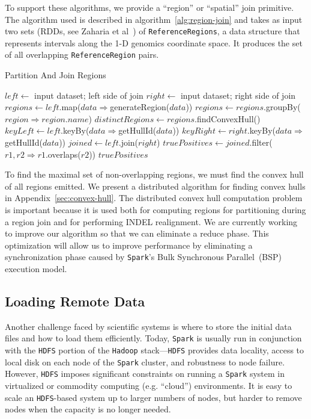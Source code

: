 \documentclass{acm_proc_article-sp}
\begin{document}
To support these algorithms, we provide a ``region'' or ``spatial'' join primitive. The algorithm used is described
in algorithm~\ref{alg:region-join} and takes as input two sets (RDDs, see Zaharia et al~\cite{zaharia12}) of
\texttt{ReferenceRegions}, a data structure that represents intervals along the 1-D genomics coordinate
space. It produces the set of all overlapping \texttt{ReferenceRegion} pairs.

\begin{algorithm}
\caption{Partition And Join Regions}
\label{alg:region-join}
\begin{algorithmic}
\STATE $left \leftarrow$ input dataset; left side of join
\STATE $right \leftarrow$ input dataset; right side of join
\STATE $regions \leftarrow left$.map($data \Rightarrow $generateRegion($data$))
\STATE $regions \leftarrow regions$.groupBy($region \Rightarrow region$.$name$)
\STATE $distinctRegions \leftarrow regions$.findConvexHull()
\STATE $keyLeft \leftarrow left$.keyBy($data \Rightarrow $getHullId($data$))
\STATE $keyRight \leftarrow right$.keyBy($data \Rightarrow $getHullId($data$))
\STATE $joined \leftarrow left$.join($right$)
\STATE $truePositives \leftarrow joined$.filter($r1, r2 \Rightarrow r1$.overlaps($r2$))
\RETURN $truePositives$
\end{algorithmic}
\end{algorithm}

To find the maximal set of non-overlapping regions, we must find the convex hull of all regions emitted.
We present a distributed algorithm for finding convex hulls in Appendix~\ref{sec:convex-hull}. The
distributed convex hull computation problem is important because it is used both for computing regions
for partitioning during a region join and for performing INDEL realignment. We are currently working to
improve our algorithm so that we can eliminate a reduce phase. This optimization will allow us to improve
performance by eliminating a synchronization phase caused by \texttt{Spark}'s Bulk Synchronous
Parallel~(BSP) execution model.

\subsection{Loading Remote Data}
\label{sec:loading-remote-data}

Another challenge faced by scientific systems is where to store the initial data files and how to load them
efficiently. Today, \texttt{Spark} is usually run in conjunction with the \texttt{HDFS} portion of the \texttt{Hadoop}
stack---\texttt{HDFS} provides data locality, access to local disk on each node of the \texttt{Spark} cluster, and
robustness to node failure. However, \texttt{HDFS} imposes significant constraints on running a \texttt{Spark} system
in virtualized or
commodity computing (e.g. ``cloud'') environments.  It is easy to scale an \texttt{HDFS}-based system up to
larger numbers of nodes, but harder to remove nodes when the capacity is no longer needed.  
\end{document}
